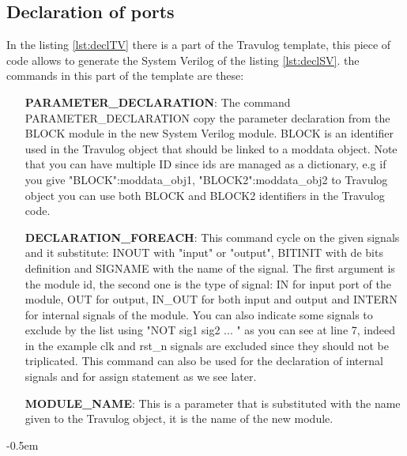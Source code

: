 {	\subsection{Declaration of ports}{

		In the listing \ref{lst:declTV} there is a part of the Travulog template, this piece of code allows to generate the System Verilog of the listing \ref{lst:declSV}. the commands in this part of the template are these: 
		\begin{itemize}
			\item [\textbf{PARAMETER\_DECLARATION}:] The command PARAMETER\_DECLARATION copy the parameter declaration from the BLOCK module in the new System Verilog module. BLOCK is an identifier used in the Travulog object that should be linked to a moddata object. Note that you can have multiple ID since ids are managed as a dictionary, e.g if you give {"BLOCK":moddata\_obj1, "BLOCK2":moddata\_obj2} to Travulog object you can use both BLOCK and BLOCK2 identifiers in the Travulog code.
			\item [\textbf{DECLARATION\_FOREACH}:] This command cycle on the given signals and it substitute: INOUT  with "input" or "output",  BITINIT with de bits definition and SIGNAME with the name of the signal. The first argument is the module id, the second one is the type of signal: IN for input port of the module, OUT for output, IN\_OUT for both input and output and INTERN for internal signals of the module. You can also indicate some signals to exclude by the list using "NOT sig1 sig2 ... " as you can see at line 7, indeed in the example clk and rst\_n signals are excluded since they should not be triplicated.
			This command can also be used for the declaration of internal signals and for assign statement as we see later.
			\item [\textbf{MODULE\_NAME}:] This is a parameter that is substituted with the name given to the Travulog object, it is the name of the new module.
		\end{itemize}
			
			
		\openup -0.5em
		
		\begin{parcolumns}[colwidths={1=0.54\textwidth}, distance=0.5em]{2}
\end{parcolumns}}}
